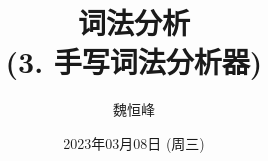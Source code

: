\documentclass[]{beamer}
\title[词法分析]{词法分析 \\ (3. 手写词法分析器)}
\author[魏恒峰]{\large 魏恒峰}
\institute{hfwei@nju.edu.cn}
\date{2023年03月08日 (周三)}
\begin{document}
\maketitle


\thankyou{}

\end{document}
